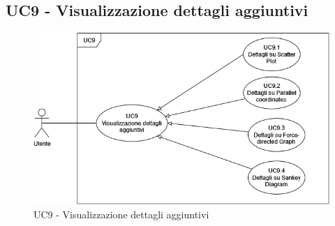\subsection{UC9 - Visualizzazione dettagli aggiuntivi}
\label{sec:UC9}
\begin{figure}[h!]
    \centering
    \includegraphics[scale=0.60]{../../assets/UC9-DettagliAggiuntivi.png}
    \caption{UC9 - Visualizzazione dettagli aggiuntivi}
\end{figure}
